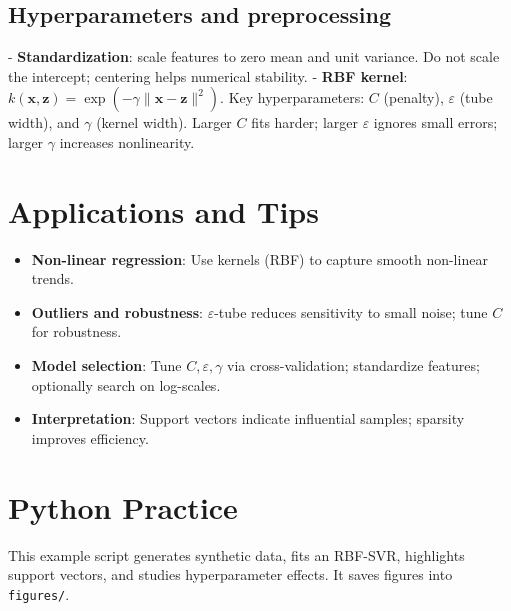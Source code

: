 \documentclass{article}
\begin{document}
\subsection{Hyperparameters and preprocessing}
- \textbf{Standardization}: scale features to zero mean and unit variance. Do not scale the intercept; centering helps numerical stability.
- \textbf{RBF kernel}: \(k(\mathbf{x},\mathbf{z})=\exp(-\gamma\lVert\mathbf{x}-\mathbf{z}\rVert^2)\). Key hyperparameters: \(C\) (penalty), \(\varepsilon\) (tube width), and \(\gamma\) (kernel width). Larger \(C\) fits harder; larger \(\varepsilon\) ignores small errors; larger \(\gamma\) increases nonlinearity.

\section{Applications and Tips}
\begin{itemize}
  \item \textbf{Non-linear regression}: Use kernels (RBF) to capture smooth non-linear trends.
  \item \textbf{Outliers and robustness}: \(\varepsilon\)-tube reduces sensitivity to small noise; tune \(C\) for robustness.
  \item \textbf{Model selection}: Tune \(C,\varepsilon,\gamma\) via cross-validation; standardize features; optionally search on log-scales.
  \item \textbf{Interpretation}: Support vectors indicate influential samples; sparsity improves efficiency.
\end{itemize}

\section{Python Practice}
This example script generates synthetic data, fits an RBF-SVR, highlights support vectors, and studies hyperparameter effects. It saves figures into \texttt{figures/}.
\end{document}

